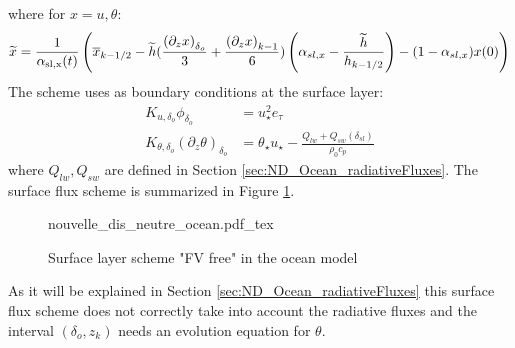 where for $x=u,\theta$:
\begin{equation}
	\label{eq:ND_Ocean_semiDiscreteEkmanEqPTFVfree}
	\widetilde{x} = \frac{1}{\alpha_{\rm sl, x}(t)}
	\left(
	\overline{x}_{k-1/2} -
	\widetilde{h}(\frac{{(\partial_z x)}_{\delta_o}}{3} +
	\frac{{(\partial_z x)}_{k-1}}{6})
	\left(\alpha_{sl, x}-\frac{\widetilde{h}}{h_{k-1/2}}\right)
	 - (1 - \alpha_{sl, x})x(0)
	\right)
\end{equation}
The scheme uses as boundary conditions at the surface layer:
\begin{equation}
\label{eq:ND_Ocean_boundaryConditionFVfree}
\begin{aligned}
	K_{u,\delta_o} \phi_{\delta_o} &=
	u_\star^2 e_\tau
	\\
	K_{\theta, \delta_o} (\partial_z \theta)_{\delta_o} &= 
	\theta_\star u_\star - \frac{Q_{lw} + Q_{sw}(\delta_{sl})}{\rho_0 c_p}
  \end{aligned}
\end{equation}
where $Q_{lw}, Q_{sw}$ are defined in Section
\ref{sec:ND_Ocean_radiativeFluxes}.
The surface flux scheme is summarized in Figure
\ref{fig:ND_Ocean_nouvelle_dis_neutre}.
\begin{figure}
	{nouvelle_dis_neutre_ocean.pdf_tex}
	\caption{Surface layer scheme "FV free" in the ocean model}
	\label{fig:ND_Ocean_nouvelle_dis_neutre}
\end{figure}
As it will be explained
in Section \ref{sec:ND_Ocean_radiativeFluxes} this surface flux scheme
does not correctly take into account the radiative fluxes and the
interval $(\delta_o, z_k)$ needs an evolution equation for $\theta$.


